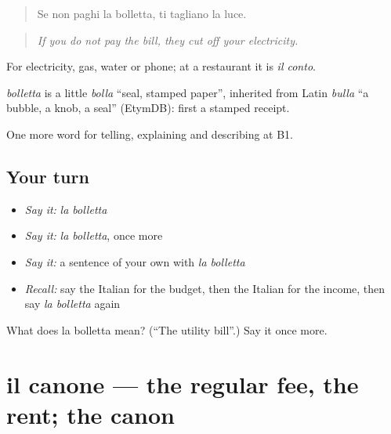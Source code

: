 \begin{quote}
Se non paghi la bolletta, ti tagliano la luce.
\end{quote}

\begin{quote}
\emph{If you do not pay the bill, they cut off your electricity.}
\end{quote}

For electricity, gas, water or phone; at a restaurant it is \emph{il conto}.

\begin{cousinweb}
\emph{bolletta} is a little \emph{bolla} \textquotedblleft{}seal, stamped paper\textquotedblright{}, inherited from Latin \emph{bulla} \textquotedblleft{}a bubble, a knob, a seal\textquotedblright{} (EtymDB): first a stamped receipt.
\end{cousinweb}

\begin{grammarlens}[title={What you've built}]
One more word for telling, explaining and describing at B1.
\end{grammarlens}

\subsection*{Your turn}
\begin{itemize}
\raggedright
  \item \emph{Say it:} \emph{la bolletta}
  \item \emph{Say it:} \emph{la bolletta}, once more
  \item \emph{Say it:} a sentence of your own with \emph{la bolletta}
  \item \emph{Recall:} say the Italian for the budget, then the Italian for the income, then say \emph{la bolletta} again
\end{itemize}

\begin{tcolorbox}[breakable,colback=teal!4,colframe=teal!35!black,title={Before you move on}]
What does la bolletta mean? (\textquotedblleft{}The utility bill\textquotedblright{}.) Say it once more.
\end{tcolorbox}
\section[il canone]{il canone — the regular fee, the rent; the canon}

\label{lesson:IT-C394-canone}



